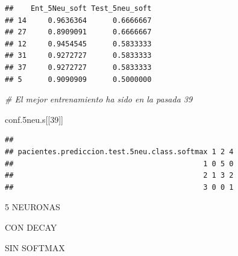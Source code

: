 \documentclass[]{article}
\newenvironment{Shaded}{\begin{snugshade}}{\end{snugshade}}
\newcommand{\CommentTok}[1]{\textcolor[rgb]{0.56,0.35,0.01}{\textit{#1}}}
\newcommand{\DecValTok}[1]{\textcolor[rgb]{0.00,0.00,0.81}{#1}}
\newcommand{\FloatTok}[1]{\textcolor[rgb]{0.00,0.00,0.81}{#1}}
\newcommand{\NormalTok}[1]{#1}
\begin{document}
\begin{verbatim}
##    Ent_5Neu_soft Test_5neu_soft
## 14     0.9636364      0.6666667
## 27     0.8909091      0.6666667
## 12     0.9454545      0.5833333
## 31     0.9272727      0.5833333
## 37     0.9272727      0.5833333
## 5      0.9090909      0.5000000
\end{verbatim}

\begin{Shaded}
\begin{Highlighting}[]
\CommentTok{# El mejor entrenamiento ha sido en la pasada 39}

\NormalTok{conf}\FloatTok{.5}\NormalTok{neu.s[[}\DecValTok{39}\NormalTok{]]}
\end{Highlighting}
\end{Shaded}

\begin{verbatim}
##                                             
## pacientes.prediccion.test.5neu.class.softmax 1 2 4
##                                            1 0 5 0
##                                            2 1 3 2
##                                            3 0 0 1
\end{verbatim}

5 NEURONAS

CON DECAY

SIN SOFTMAX
\end{document}

